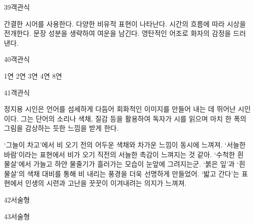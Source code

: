 \documentclass[fs9,seriesRus]{korfarm-base}
\begin{document}
\begin{kfQBlock}{39}{객관식}
\begin{kfChoices}
\kfChoice 간결한 시어를 사용한다.
\kfChoice 다양한 비유적 표현이 나타난다.
\kfChoice 시간의 흐름에 따라 시상을 전개한다.
\kfChoice 문장 성분을 생략하여 여운을 남긴다.
\kfChoice 영탄적인 어조로 화자의 감정을 드러낸다.
\end{kfChoices}
\end{kfQBlock}
\begin{kfQBlock}{40}{객관식}
\begin{kfChoices}
\kfChoice 1연
\kfChoice 2연
\kfChoice 3연
\kfChoice 4연
\kfChoice 8연
\end{kfChoices}
\end{kfQBlock}
\begin{kfQBlock}{41}{객관식}
\begin{kfEvidence}정지용 시인은 언어를 섬세하게 다듬어 회화적인 이미지를 만들어 내는 데 뛰어난 시인이다. 그는 단어의 소리나 색채, 질감 등을 활용하여 독자가 시를 읽으며 마치 한 폭의 그림을 감상하는 듯한 느낌을 받게 한다.\end{kfEvidence}
\begin{kfChoices}
\kfChoice ‘그늘이 차고’에서 비 오기 전의 어두운 색채와 차가운 느낌이 동시에 느껴져.
\kfChoice ‘서늘한 바람’이라는 표현에서 비가 오기 직전의 서늘한 촉감이 느껴지는 것 같아.
\kfChoice ‘수척한 흰 물살’에서 가늘고 하얀 물줄기가 흘러가는 모습이 눈앞에 그려지는군.
\kfChoice ‘붉은 잎’과 ‘흰 물살’의 색채 대비를 통해 비 내리는 풍경을 더욱 선명하게 만들었어.
\kfChoice ‘밟고 간다’는 표현에서 인생의 시련과 고난을 꿋꿋이 이겨내려는 의지가 느껴져.
\end{kfChoices}
\end{kfQBlock}
\begin{kfQBlock}{42}{서술형}
\end{kfQBlock}
\begin{kfQBlock}{43}{서술형}
\end{kfQBlock}
\kfEndMC


\end{document}
